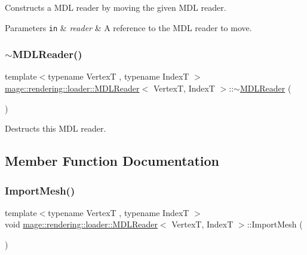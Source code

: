 Constructs a M\+DL reader by moving the given M\+DL reader.


\begin{DoxyParams}[1]{Parameters}
\mbox{\tt in}  & {\em reader} & A reference to the M\+DL reader to move. \\
\hline
\end{DoxyParams}
\hypertarget{classmage_1_1rendering_1_1loader_1_1_m_d_l_reader_a2f4c6bd8c2ef49180538ddfe5530e230}{}\label{classmage_1_1rendering_1_1loader_1_1_m_d_l_reader_a2f4c6bd8c2ef49180538ddfe5530e230} 
\subsubsection{\texorpdfstring{$\sim$\+M\+D\+L\+Reader()}{~MDLReader()}}
{\footnotesize\ttfamily template$<$typename VertexT , typename IndexT $>$ \\
\hyperlink{classmage_1_1rendering_1_1loader_1_1_m_d_l_reader}{mage\+::rendering\+::loader\+::\+M\+D\+L\+Reader}$<$ VertexT, IndexT $>$\+::$\sim$\hyperlink{classmage_1_1rendering_1_1loader_1_1_m_d_l_reader}{M\+D\+L\+Reader} (\begin{DoxyParamCaption}{ }\end{DoxyParamCaption})}

Destructs this M\+DL reader. 

\subsection{Member Function Documentation}
\hypertarget{classmage_1_1rendering_1_1loader_1_1_m_d_l_reader_a512618ed9e79671dbcb468d155272b7e}{}\label{classmage_1_1rendering_1_1loader_1_1_m_d_l_reader_a512618ed9e79671dbcb468d155272b7e} 
\subsubsection{\texorpdfstring{Import\+Mesh()}{ImportMesh()}}
{\footnotesize\ttfamily template$<$typename VertexT , typename IndexT $>$ \\
void \hyperlink{classmage_1_1rendering_1_1loader_1_1_m_d_l_reader}{mage\+::rendering\+::loader\+::\+M\+D\+L\+Reader}$<$ VertexT, IndexT $>$\+::Import\+Mesh (\begin{DoxyParamCaption}{ }\end{DoxyParamCaption})\hspace{0.3cm}{\ttfamily [private]}}

